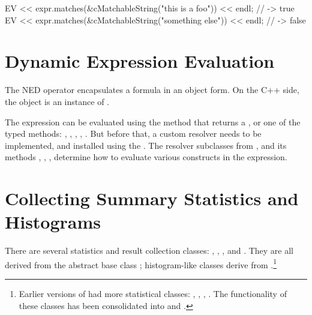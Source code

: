 \begin{cpp}
EV << expr.matches(&cMatchableString("this is a foo")) << endl; // -> true
EV << expr.matches(&cMatchableString("something else")) << endl; // -> false
\end{cpp}


\section{Dynamic Expression Evaluation}
\label{sec:sim-lib:dynamic-expressions}

The NED  operator encapsulates a formula in an object form.
On the C++ side, the object is an instance of .

The expression can be evaluated using the  method that returns
a , or one of the typed methods: ,
, , ,
. But before that, a custom resolver needs to be implemented, and
installed using the . The resolver subclasses from
, and its methods ,
, ,  determine
how to evaluate various constructs in the expression.


\section{Collecting Summary Statistics and Histograms}
\label{sec:sim-lib:statistics}

There are several statistics and result collection classes:
, , , and
. They are all derived from the abstract base class
; histogram-like classes derive from
.\footnote{Earlier versions of {\opp} had more
statistical classes: , ,
, . The functionality
of these classes has been consolidated into  and
.}

